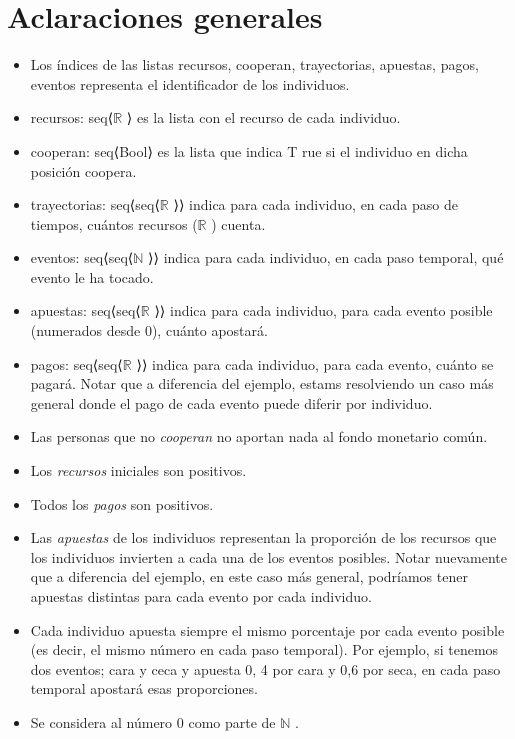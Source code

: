 \documentclass[10pt,a4paper]{article}
\begin{document}
\maketitle

\section{Aclaraciones generales} 


\begin{itemize}
	\item Los índices de las listas recursos, cooperan, trayectorias, apuestas, pagos, eventos representa el identificador de los
    individuos.
	\item recursos: seq⟨$%
    \mathbb{R}
    $%
    ⟩ es la lista con el recurso de cada individuo.
	\item cooperan: seq⟨Bool⟩ es la lista que indica T rue si el individuo en dicha posición coopera.
	\item trayectorias: seq⟨seq⟨$%
    \mathbb{R}
    $%
    ⟩⟩ indica para cada individuo, en cada paso de tiempos, cuántos recursos ($%
    \mathbb{R}
    $%
    ) cuenta.
	\item eventos: seq⟨seq⟨$%
    \mathbb{N}
    $%
    ⟩⟩ indica para cada individuo, en cada paso temporal, qué evento le ha tocado.
	\item apuestas: seq⟨seq⟨$%
    \mathbb{R}
    $%
    ⟩⟩ indica para cada individuo, para cada evento posible (numerados desde 0), cuánto apostará.
	\item pagos: seq⟨seq⟨$%
    \mathbb{R}
    $%
    ⟩⟩ indica para cada individuo, para cada evento, cuánto se pagará. Notar que a diferencia del ejemplo, estams resolviendo un caso más general donde el pago de cada evento puede diferir por individuo.
	\item Las personas que no \textit{cooperan} no aportan nada al fondo monetario común.
	\item Los \textit{recursos} iniciales son positivos.
	\item Todos los \textit{pagos} son positivos.
	\item Las \textit{apuestas} de los individuos representan la proporción de los recursos que los individuos invierten a cada una de los eventos posibles. Notar nuevamente que a diferencia del ejemplo, en este caso más general, podríamos tener apuestas distintas para cada evento por cada individuo.
	\item Cada individuo apuesta siempre el mismo porcentaje por cada evento posible (es decir, el mismo número en cada paso temporal). Por ejemplo, si tenemos dos eventos; cara y ceca y apuesta 0, 4 por cara y 0,6 por seca, en cada paso temporal apostará esas proporciones.
    \item Se considera al número 0 como parte de  $%
    \mathbb{N}
    $%
    .
\end{itemize}
\end{document}
